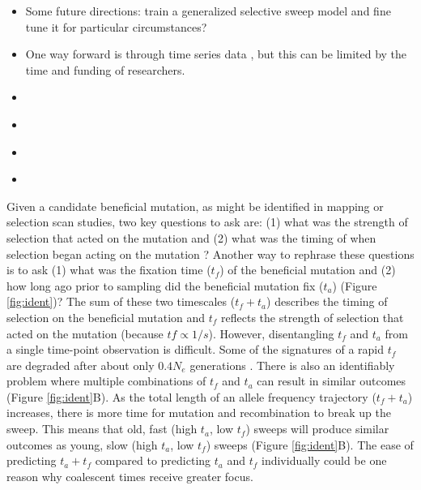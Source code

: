 
\begin{itemize}

\item Some future directions: train a generalized selective sweep model and fine tune it for particular circumstances?
    
\item One way forward is through time series data \citep{whitehouse_timesweeper_2023}, but this can be limited by the time and funding of researchers.

\item \citep{ormond_inferring_2016}

\item \citep{flagel_unreasonable_2019}

\item \citep{ormond_inferring_2016}

\item \citep{torada_imagene_2019}

\end{itemize}

Given a candidate beneficial mutation, as might be identified in mapping or selection scan studies, two key questions to ask are: (1) what was the strength of selection that acted on the mutation and (2) what was the timing of when selection began acting on the mutation \citep{he_estimation_2020, bisschop_sweeps_2021}? Another way to rephrase these questions is to ask (1) what was the fixation time ($t_f$) of the beneficial mutation and (2) how long ago prior to sampling did the beneficial mutation fix ($t_a$) (Figure \ref{fig:ident})? The sum of these two timescales ($t_f + t_a$) describes the timing of selection on the beneficial mutation and $t_f$ reflects the strength of selection that acted on the mutation (because $tf \propto 1/s$). However, disentangling $t_f$ and $t_a$ from a single time-point observation is difficult. Some of the signatures of a rapid $t_f$ are degraded after about only $0.4N_e$ generations \citep{przeworski_signature_2002}. There is also an identifiably problem where multiple combinations of $t_f$ and $t_a$ can result in similar outcomes (Figure \ref{fig:ident}B). As the total length of an allele frequency trajectory ($t_f + t_a$) increases, there is more time for mutation and recombination to break up the sweep. This means that old, fast (high $t_a$, low $t_f$) sweeps will produce similar outcomes as young, slow (high $t_a$, low $t_f$) sweeps (Figure \ref{fig:ident}B). The ease of predicting $t_a + t_f$ compared to predicting $t_a$ and $t_f$ individually could be one reason why coalescent times receive greater focus.


